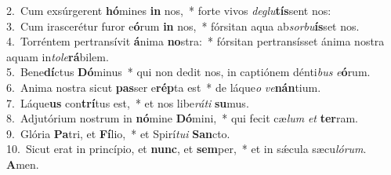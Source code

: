 {2.~}Cum exsúrgerent \textbf{hó}mines \textbf{in} nos,~* forte vivos \textit{de}\textit{glu}\textbf{tís}sent nos:\\
{3.~}Cum irascerétur furor e\textbf{ó}rum \textbf{in} nos,~* fórsitan aqua ab\textit{sor}\textit{bu}\textbf{ís}set nos.\\
{4.~}Torréntem pertransívit \textbf{á}nima \textbf{no}stra:~* fórsitan pertransísset ánima nostra aquam in\textit{to}\textit{le}\textbf{rá}bilem.\\
{5.~}Bene\textbf{dí}ctus \textbf{Dó}minus~* qui non dedit nos, in captiónem dénti\textit{bus} \textit{e}\textbf{ó}rum.\\
{6.~}Anima nostra sicut \textbf{pas}ser e\textbf{rép}ta est~* de láque\textit{o} \textit{ve}\textbf{nán}tium.\\
{7.~}Láque\textbf{us} con\textbf{trí}tus est,~* et nos libe\textit{rá}\textit{ti} \textbf{su}mus.\\
{8.~}Adjutórium nostrum in \textbf{nó}mine \textbf{Dó}mini,~* qui fecit cæ\textit{lum} \textit{et} \textbf{ter}ram.\\
{9.~}Glória \textbf{Pa}tri, et \textbf{Fí}lio,~* et Spirí\textit{tu}\textit{i} \textbf{San}cto.\\
{10.~}Sicut erat in princípio, et \textbf{nunc}, et \textbf{sem}per,~* et in sǽcula sæcu\textit{ló}\textit{rum}. \textbf{A}men.\\
